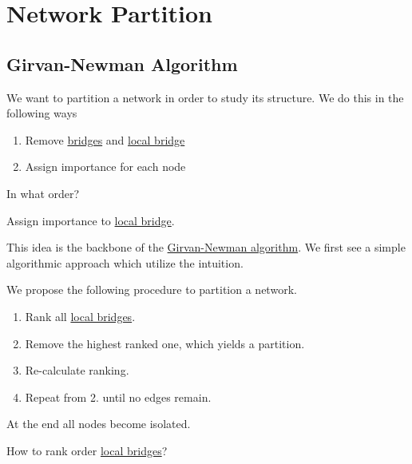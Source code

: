 \chapter{Network Partition}
\section{Girvan-Newman Algorithm}
\begin{intuition}
	We want to partition a network in order to study its structure. We do this in the following ways
	\begin{enumerate}
		\item Remove \hyperref[def:bridge]{bridges} and \hyperref[def:local-bridge]{local bridge}
		\item Assign importance for each node
	\end{enumerate}
\end{intuition}

\begin{problem}
In what order?
\end{problem}
\begin{answer}
	Assign importance to \hyperref[def:local-bridge]{local bridge}.
\end{answer}

This idea is the backbone of the \hyperref[algo:Girvan-Newman-algorithm]{Girvan-Newman algorithm}. We first see a simple algorithmic
approach which utilize the intuition.
\begin{remark}
	We propose the following procedure to partition a network.
	\begin{enumerate}
		\item Rank all \hyperref[def:local-bridge]{local bridges}.
		\item Remove the highest ranked one, which yields a partition.
		\item Re-calculate ranking.
		\item Repeat from 2. until no edges remain.
	\end{enumerate}
\end{remark}

\begin{note}
	At the end all nodes become isolated.
\end{note}

\begin{problem}
How to rank order \hyperref[def:local-bridge]{local bridges}?
\end{problem}

